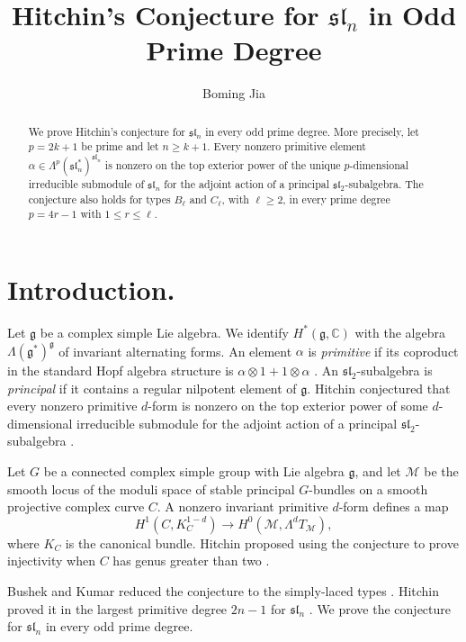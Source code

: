 \documentclass[12pt]{article}
\title{Hitchin's Conjecture for $\mathfrak{sl}_n$ in Odd Prime Degree}
\author{Boming Jia}
\date{}
\theoremstyle{definition}
\theoremstyle{remark}
\newcommand{\C}{\mathbb C}
\begin{document}
\setlength{\droptitle}{-6.75em}
\maketitle
\vspace{-4em}

\begin{abstract}
We prove Hitchin's conjecture for $\mathfrak{sl}_n$ in every odd prime
degree. More precisely, let $p=2k+1$ be prime and let $n\geq k+1$.
Every nonzero primitive element
$\alpha\in\Lambda^p(\mathfrak{sl}_n^*)^{\mathfrak{sl}_n}$
is nonzero on the top exterior power of the unique $p$-dimensional
irreducible submodule of $\mathfrak{sl}_n$ for the adjoint action
of a principal $\mathfrak{sl}_2$-subalgebra.
The conjecture also holds for types
$B_\ell$ and $C_\ell$, with $\ell\geq2$, in every prime degree
$p=4r-1$ with $1\leq r\leq\ell$.
\end{abstract}

\section{Introduction.}\label{sec:introduction}

Let $\mathfrak g$ be a complex simple Lie algebra. We identify
$H^*(\mathfrak g,\C)$ with the algebra
$\Lambda(\mathfrak g^*)^{\mathfrak g}$ of invariant alternating forms.
An element $\alpha$ is \emph{primitive} if its coproduct
in the standard Hopf algebra structure is
$\alpha\otimes1+1\otimes\alpha$
\cite[Theorem 9.2 and Section 10]{Koszul1950}.
An $\mathfrak{sl}_2$-subalgebra is \emph{principal} if it contains a
regular nilpotent element of $\mathfrak g$. Hitchin conjectured that
every nonzero primitive $d$-form is nonzero on the top exterior power
of some $d$-dimensional irreducible submodule for the adjoint action
of a principal $\mathfrak{sl}_2$-subalgebra
\cite[Section 2.2, final remark]{Hitchin2011}.

Let $G$ be a connected complex simple group with Lie algebra
$\mathfrak g$, and let $\mathcal M$ be the smooth locus of the moduli
space of stable principal $G$-bundles on a smooth projective complex
curve $C$. A nonzero invariant primitive $d$-form defines a map
\[
 H^1(C,K_C^{1-d})\longrightarrow H^0(\mathcal M,\Lambda^dT_{\mathcal M}),
\]
where $K_C$ is the canonical bundle. Hitchin proposed using the
conjecture to prove injectivity when $C$ has genus greater than two
\cite[Sections 2.1--2.2]{Hitchin2011}.

Bushek and Kumar reduced the conjecture to the simply-laced types
\cite[Theorem 2.5]{BushekKumar2014}. Hitchin proved it in the largest
primitive degree $2n-1$ for $\mathfrak{sl}_n$
\cite[Section 4.3]{Hitchin2023}. We prove the conjecture for
$\mathfrak{sl}_n$ in every odd prime degree.
\end{document}
